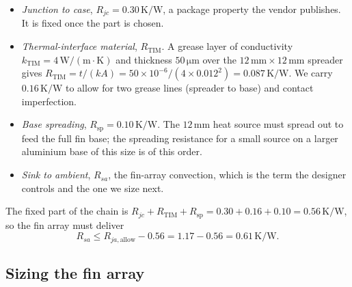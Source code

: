 

\begin{itemize}[leftmargin=*]
  \item \emph{Junction to case}, $R_{jc} = 0.30\,\si{\kelvin}/\text{W}$,
    a package property the vendor publishes. It is fixed once the part
    is chosen.
  \item \emph{Thermal-interface material}, $R_{\text{TIM}}$. A grease
    layer of conductivity $k_{\text{TIM}} = 4\,\text{W}/(\text{m}\cdot
    \si{\kelvin})$ and thickness $50\,\si{\micro\meter}$ over the
    $12\,\si{\milli\meter} \times 12\,\si{\milli\meter}$ spreader gives
    $R_{\text{TIM}} = t/(k A) = 50 \times 10^{-6}/(4 \times 0.012^2) =
    0.087\,\si{\kelvin}/\text{W}$. We carry $0.16\,\si{\kelvin}/\text{W}$
    to allow for two grease lines (spreader to base) and contact
    imperfection.
  \item \emph{Base spreading}, $R_{\text{sp}} = 0.10\,\si{\kelvin}/
    \text{W}$. The $12\,\si{\milli\meter}$ heat source must spread out
    to feed the full fin base; the spreading resistance for a small
    source on a larger aluminium base of this size is of this order.
  \item \emph{Sink to ambient}, $R_{sa}$, the fin-array convection,
    which is the term the designer controls and the one we size next.
\end{itemize}

The fixed part of the chain is $R_{jc} + R_{\text{TIM}} + R_{\text{sp}}
= 0.30 + 0.16 + 0.10 = 0.56\,\si{\kelvin}/\text{W}$, so the fin array
must deliver
\[
R_{sa} \leq R_{ja,\text{allow}} - 0.56 = 1.17 - 0.56 = 0.61\,\si{
\kelvin}/\text{W}.
\]

\subsection{Sizing the fin array}

